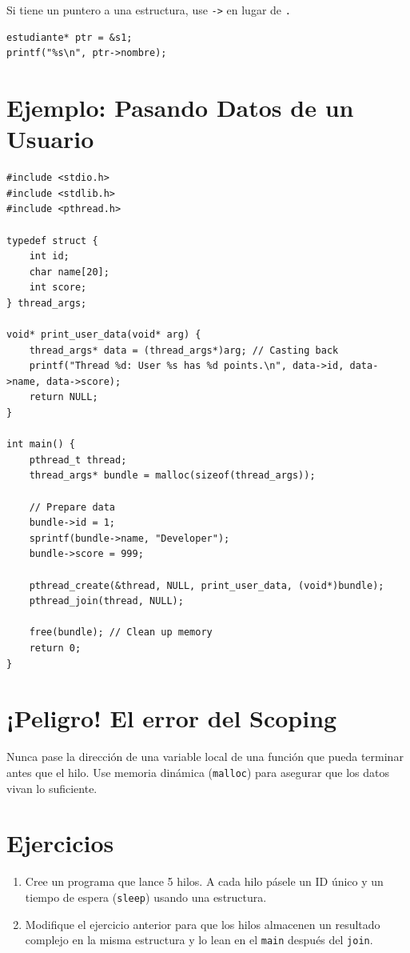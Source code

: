 \documentclass[12pt,a4paper]{article}
\begin{document}
Si tiene un puntero a una estructura, use \texttt{->} en lugar de \texttt{.}

\begin{lstlisting}
estudiante* ptr = &s1;
printf("%s\n", ptr->nombre);
\end{lstlisting}

\newpage

\section{Ejemplo: Pasando Datos de un Usuario}
\begin{lstlisting}
#include <stdio.h>
#include <stdlib.h>
#include <pthread.h>

typedef struct {
    int id;
    char name[20];
    int score;
} thread_args;

void* print_user_data(void* arg) {
    thread_args* data = (thread_args*)arg; // Casting back
    printf("Thread %d: User %s has %d points.\n", data->id, data->name, data->score);
    return NULL;
}

int main() {
    pthread_t thread;
    thread_args* bundle = malloc(sizeof(thread_args));

    // Prepare data
    bundle->id = 1;
    sprintf(bundle->name, "Developer");
    bundle->score = 999;

    pthread_create(&thread, NULL, print_user_data, (void*)bundle);
    pthread_join(thread, NULL);

    free(bundle); // Clean up memory
    return 0;
}
\end{lstlisting}

\section{¡Peligro! El error del Scoping}
Nunca pase la dirección de una variable local de una función que pueda terminar antes que el hilo. Use memoria dinámica (\texttt{malloc}) para asegurar que los datos vivan lo suficiente.

\section{Ejercicios}
\begin{enumerate}
    \item Cree un programa que lance 5 hilos. A cada hilo pásele un ID único y un tiempo de espera (\texttt{sleep}) usando una estructura.
    \item Modifique el ejercicio anterior para que los hilos almacenen un resultado complejo en la misma estructura y lo lean en el \texttt{main} después del \texttt{join}.
\end{enumerate}
\end{document}
